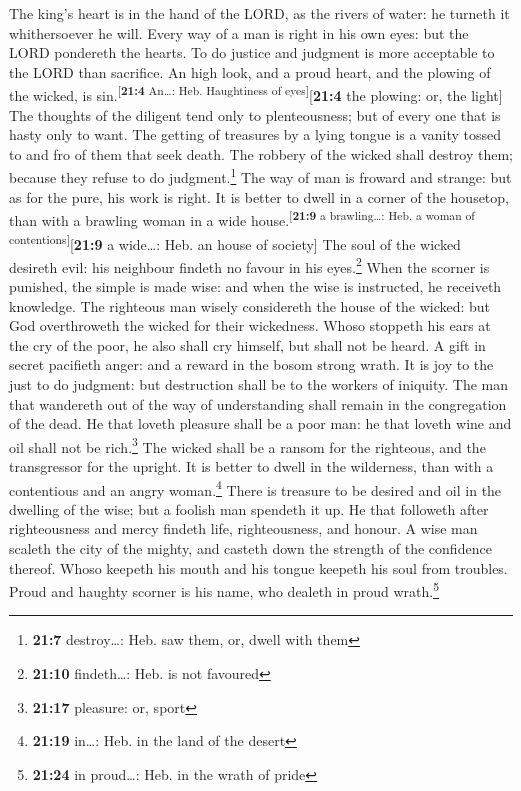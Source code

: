  The king's heart is in the hand of the LORD, as the
rivers of water: he turneth it whithersoever he will. 
Every way of a man is right in his own eyes: but the LORD pondereth the
hearts.  To do justice and judgment is more acceptable to
the LORD than sacrifice.  An high look, and a proud heart,
and the plowing of the wicked, is sin.\textsuperscript{{[}\textbf{21:4}
An\ldots: Heb. Haughtiness of eyes{]}}{[}\textbf{21:4} the plowing: or,
the light{]}  The thoughts of the diligent tend only to
plenteousness; but of every one that is hasty only to want.
 The getting of treasures by a lying tongue is a vanity
tossed to and fro of them that seek death.  The robbery of
the wicked shall destroy them; because they refuse to do
judgment.\footnote{\textbf{21:7} destroy\ldots: Heb. saw them, or, dwell
  with them}  The way of man is froward and strange: but
as for the pure, his work is right.  It is better to dwell
in a corner of the housetop, than with a brawling woman in a wide
house.\textsuperscript{{[}\textbf{21:9} a brawling\ldots: Heb. a woman
of contentions{]}}{[}\textbf{21:9} a wide\ldots: Heb. an house of
society{]}  The soul of the wicked desireth evil: his
neighbour findeth no favour in his eyes.\footnote{\textbf{21:10}
  findeth\ldots: Heb. is not favoured}  When the scorner
is punished, the simple is made wise: and when the wise is instructed,
he receiveth knowledge.  The righteous man wisely
considereth the house of the wicked: but God overthroweth the wicked for
their wickedness.  Whoso stoppeth his ears at the cry of
the poor, he also shall cry himself, but shall not be heard.
 A gift in secret pacifieth anger: and a reward in the
bosom strong wrath.  It is joy to the just to do
judgment: but destruction shall be to the workers of iniquity.
 The man that wandereth out of the way of understanding
shall remain in the congregation of the dead.  He that
loveth pleasure shall be a poor man: he that loveth wine and oil shall
not be rich.\footnote{\textbf{21:17} pleasure: or, sport}
 The wicked shall be a ransom for the righteous, and the
transgressor for the upright.  It is better to dwell in
the wilderness, than with a contentious and an angry woman.\footnote{\textbf{21:19}
  in\ldots: Heb. in the land of the desert}  There is
treasure to be desired and oil in the dwelling of the wise; but a
foolish man spendeth it up.  He that followeth after
righteousness and mercy findeth life, righteousness, and honour.
 A wise man scaleth the city of the mighty, and casteth
down the strength of the confidence thereof.  Whoso
keepeth his mouth and his tongue keepeth his soul from troubles.
 Proud and haughty scorner is his name, who dealeth in
proud wrath.\footnote{\textbf{21:24} in proud\ldots: Heb. in the wrath
  of pride}

